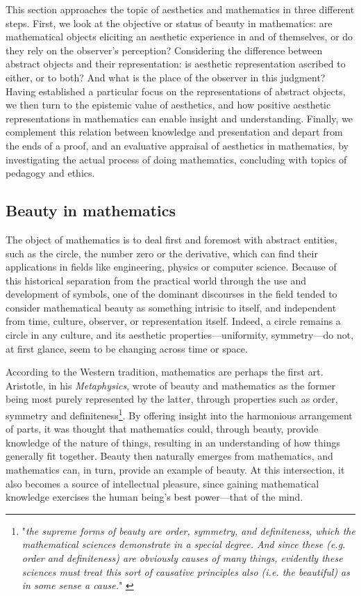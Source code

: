 This section approaches the topic of aesthetics and mathematics in three different steps. First, we look at the objective or status of beauty in mathematics: are mathematical objects eliciting an aesthetic experience in and of themselves, or do they rely on the observer's perception? Considering the difference between abstract objects and their representation: is aesthetic representation ascribed to either, or to both? And what is the place of the observer in this judgment? Having  established a particular focus on the representations of abstract objects, we then turn to the epistemic value of aesthetics, and how positive aesthetic representations in mathematics can enable insight and understanding. Finally, we complement this relation between knowledge and presentation and depart from the ends of a proof, and an evaluative appraisal of aesthetics in mathematics, by investigating the actual process of doing mathematics, concluding with topics of pedagogy and ethics.

\subsection{Beauty in mathematics}
\label{subsec:beauty-mathematics}

The object of mathematics is to deal first and foremost with abstract entities, such as the circle, the number zero or the derivative, which can find their applications in fields like engineering, physics or computer science. Because of this historical separation from the practical world through the use and development of symbols, one of the dominant discourses in the field tended to consider mathematical beauty as something intrisic to itself, and independent from time, culture, observer, or representation itself. Indeed, a circle remains a circle in any culture, and its aesthetic properties—uniformity, symmetry—do not, at first glance, seem to be changing across time or space.

According to the Western tradition, mathematics are perhaps the first art. Aristotle, in his \emph{Metaphysics}, wrote of beauty and mathematics as the former being most purely represented by the latter, through properties such as order, symmetry and definiteness\footnote{"\emph{the supreme forms of beauty are order, symmetry, and definiteness, which the mathematical sciences demonstrate in a special degree. And since these (e.g. order and definiteness) are obviously causes of many things, evidently these sciences must treat this sort of causative principles also (i.e. the beautiful) as in some sense a cause.}" \citep{aristotle_metaphysics_2006}}. By offering insight into the harmonious arrangement of parts, it was thought that mathematics could, through beauty, provide knowledge of the nature of things, resulting in an understanding of how things generally fit together. Beauty then naturally emerges from mathematics, and mathematics can, in turn, provide an example of beauty. At this intersection, it also becomes a source of intellectual pleasure, since gaining mathematical knowledge exercises the human being's best power—that of the mind.

